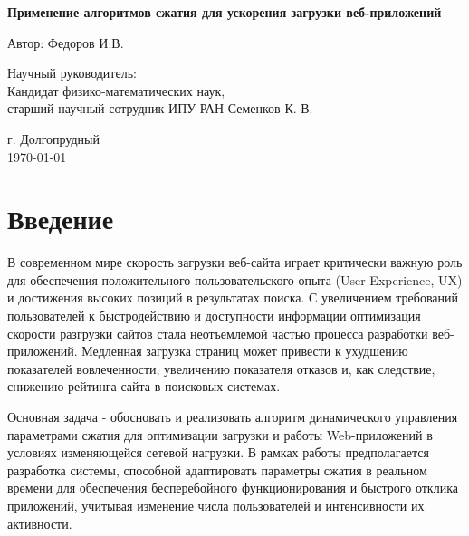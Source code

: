 \documentclass[12pt]{article}
\begin{document}
\begin{titlepage}
    \centering
    \vspace*{2cm}

    {\LARGE\bfseries Применение алгоритмов сжатия для ускорения загрузки веб-приложений\par}
    \vspace{1cm}

    {\large Автор: Федоров И.В.\par}
    \vspace{1.5cm}

    {\large Научный руководитель: \\ Кандидат физико-математических наук,\\ старший научный сотрудник ИПУ РАН Семенков К. В.\par}
    \vspace{2cm}

    {\large г. Долгопрудный \\ \today\par}

\end{titlepage}

\tableofcontents

\newpage

\section{Введение}

В современном мире скорость загрузки веб-сайта играет критически важную роль для обеспечения положительного пользовательского опыта (User Experience, UX)
и достижения высоких позиций в результатах поиска. С увеличением требований пользователей к быстродействию и доступности информации оптимизация
скорости разгрузки сайтов стала неотъемлемой частью процесса разработки веб-приложений.
Медленная загрузка страниц может привести к ухудшению показателей вовлеченности, увеличению показателя отказов и, как следствие,
снижению рейтинга сайта в поисковых системах.

Основная задача - обосновать и реализовать алгоритм динамического управления параметрами сжатия для оптимизации загрузки и работы Web-приложений в условиях изменяющейся сетевой нагрузки.
В рамках работы предполагается разработка системы, способной адаптировать параметры сжатия в реальном времени для обеспечения бесперебойного функционирования и быстрого отклика приложений,
учитывая изменение числа пользователей и интенсивности их активности.
\end{document}

